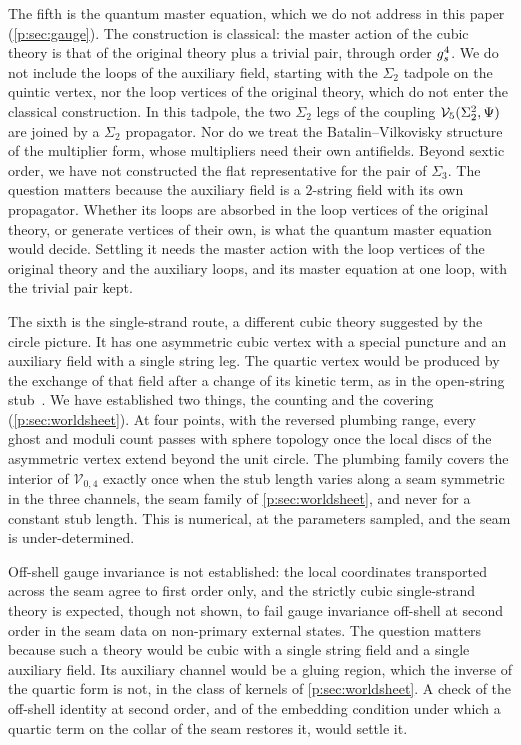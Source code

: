 The fifth is the quantum master equation, which we do not address in this paper (\cref{p:sec:gauge}).
The construction is classical: the master action of the cubic theory is that of the original theory plus a trivial pair, through order $g_s^4$.
We do not include the loops of the auxiliary field, starting with the $\Sigma_2$ tadpole on the quintic vertex, nor the loop vertices of the original theory, which do not enter the classical construction.
  In this tadpole, the two $\Sigma_2$ legs of the coupling $\mathcal{V}_{5}(\Sigma_2^2, \Psi)$ are joined by a $\Sigma_2$ propagator.
  Nor do we treat the Batalin--Vilkovisky structure of the multiplier form, whose multipliers need their own antifields.
  Beyond sextic order, we have not constructed the flat representative for the pair of $\Sigma_3$.
The question matters because the auxiliary field is a $2$-string field with its own propagator.
Whether its loops are absorbed in the loop vertices of the original theory, or generate vertices of their own, is what the quantum master equation would decide.
Settling it needs the master action with the loop vertices of the original theory and the auxiliary loops, and its master equation at one loop, with the trivial pair kept.

The sixth is the single-strand route, a different cubic theory suggested by the circle picture.
It has one asymmetric cubic vertex with a special puncture and an auxiliary field with a single string leg.
The quartic vertex would be produced by the exchange of that field after a change of its kinetic term, as in the open-string stub~\cite{Erbin:2024:OpenStringStub}.
We have established two things, the counting and the covering (\cref{p:sec:worldsheet}).
At four points, with the reversed plumbing range, every ghost and moduli count passes with sphere topology once the local discs of the asymmetric vertex extend beyond the unit circle.
The plumbing family covers the interior of $\mathcal V_{0,4}$ exactly once when the stub length varies along a seam symmetric in the three channels, the seam family of \cref{p:sec:worldsheet}, and never for a constant stub length.
This is numerical, at the parameters sampled, and the seam is under-determined.

Off-shell gauge invariance is not established: the local coordinates transported across the seam agree to first order only, and the strictly cubic single-strand theory is expected, though not shown, to fail gauge invariance off-shell at second order in the seam data on non-primary external states.
The question matters because such a theory would be cubic with a single string field and a single auxiliary field.
Its auxiliary channel would be a gluing region, which the inverse of the quartic form is not, in the class of kernels of \cref{p:sec:worldsheet}.
A check of the off-shell identity at second order, and of the embedding condition under which a quartic term on the collar of the seam restores it, would settle it.

